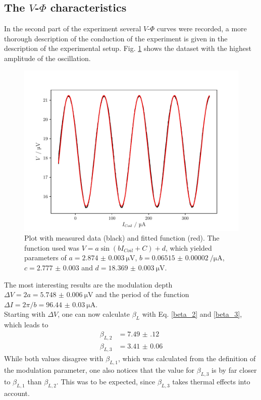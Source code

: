 \documentclass[a4paper,10pt]{article}
\begin{document}
\subsection{The $V$-$\Phi$ characteristics}
\label{sec_v_phi}
In the second part of the experiment several $V$-$\Phi$ curves were recorded, a more thorough description of the conduction of the experiment is given in the description of the experimental setup. Fig. \ref{fig_iphi_characteristics} shows the dataset with the highest amplitude of the oscillation. \\
\begin{figure}[htp!]
    \centering
    \includegraphics[width = 0.6 \textwidth]{v_flux.pdf}
    \caption{Plot with measured data (black) and fitted function (red). The function used was $V = a \sin(b I_{Coil} + C) + d$, which yielded parameters of $a = \SI{2.874(3)}{\micro \volt}$, $b = \SI{0.06515(2)}{\per \micro \ampere}$, $c = \num{2.777(3)}$ and $d = \SI{18.369(3)}{\micro \volt}$.}
    \label{fig_iphi_characteristics}
\end{figure}
The most interesting results are the modulation depth $\Delta V = 2 a = \SI{5.748(6)}{\micro \volt}$ and the period of the function $\Delta I = 2 \pi / b = \SI{96.44(3)}{\micro \ampere}$. 
\\
Starting with $\Delta V$, one can now calculate $\beta_L$ with Eq. \ref{beta_2} and \ref{beta_3}, which leads to 
\begin{equation*}
    \begin{split}
        \beta_{L,2} &= \num{7.49(12)} \\
        \beta_{L,3} &= \num{3.41(6)}
    \end{split}
\end{equation*}
While both values disagree with $\beta_{L,1}$, which was calculated from the definition of the modulation parameter, one also notices that the value for $\beta_{L,3}$ is by far closer to $\beta_{L,1}$ than $\beta_{L,2}$. This was to be expected, since $\beta_{L,3}$ takes thermal effects into account.
\end{document}
